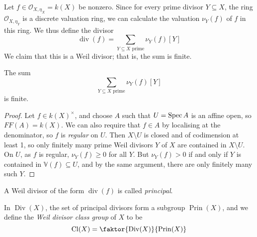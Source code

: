 Let \( f \in \mathcal O_{X, \eta_X} = k(X) \) be nonzero.
Since for every prime divisor \( Y \subseteq X \), the ring \( \mathcal O_{X, \eta_Y} \) is a discrete valuation ring, we can calculate the valuation \( \nu_Y(f) \) of \( f \) in this ring.
We thus define the divisor
\[ \operatorname{div}(f) = \sum_{Y \subseteq X \text{ prime}} \nu_Y(f) [Y] \]
We claim that this is a Weil divisor; that is, the sum is finite.
\begin{proposition}
    The sum
    \[ \sum_{Y \subseteq X \text{ prime}} \nu_Y(f) [Y] \]
    is finite.
\end{proposition}
\begin{proof}
    Let \( f \in k(X)^\times \), and choose \( A \) such that \( U = \operatorname{Spec} A \) is an affine open, so \( FF(A) = k(X) \). 
    We can also require that \( f \in A \) by localising at the denominator, so \( f \) is \emph{regular} on \( U \).
    Then \( X \setminus U \) is closed and of codimension at least 1, so only finitely many prime Weil divisors \( Y \) of \( X \) are contained in \( X \setminus U \).
    On \( U \), as \( f \) is regular, \( \nu_Y(f) \geq 0 \) for all \( Y \).
    But \( \nu_Y(f) > 0 \) if and only if \( Y \) is contained in \( \mathbb V(f) \subseteq U \), and by the same argument, there are only finitely many such \( Y \).
\end{proof}
\begin{definition}
    A Weil divisor of the form \( \operatorname{div}(f) \) is called \emph{principal}.
\end{definition}
In \( \operatorname{Div}(X) \), the set of principal divisors form a subgroup \( \operatorname{Prin}(X) \), and we define the \emph{Weil divisor class group} of \( X \) to be
\[ \operatorname{Cl}(X) = \faktor{\operatorname{Div}(X)}{\operatorname{Prin}(X)} \]
